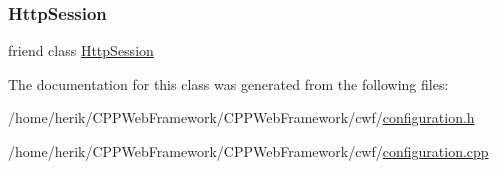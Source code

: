 \mbox{\label{class_configuration_a3e611175a551b64dda26f513067e0d04}} 
\subsubsection{\texorpdfstring{Http\+Session}{HttpSession}}
{\footnotesize\ttfamily friend class \hyperlink{class_http_session}{Http\+Session}\hspace{0.3cm}{\ttfamily [friend]}}



The documentation for this class was generated from the following files\+:\begin{DoxyCompactItemize}
\item 
/home/herik/\+C\+P\+P\+Web\+Framework/\+C\+P\+P\+Web\+Framework/cwf/\hyperlink{configuration_8h}{configuration.\+h}\item 
/home/herik/\+C\+P\+P\+Web\+Framework/\+C\+P\+P\+Web\+Framework/cwf/\hyperlink{configuration_8cpp}{configuration.\+cpp}\end{DoxyCompactItemize}
